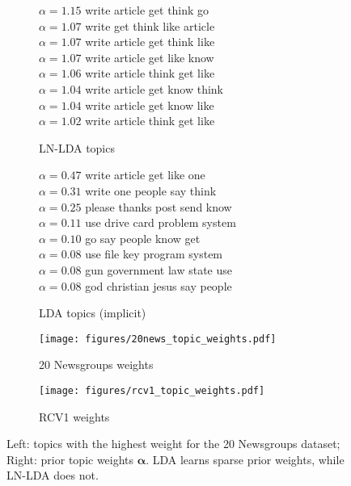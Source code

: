 \documentclass{article}
\let\vec\bm
\begin{document}
\begin{figure}
    \begin{subfigure}[b]{0.24\linewidth}
\tiny
$\alpha=1.15$ write article get think go \\
$\alpha=1.07$ write get think like article \\
$\alpha=1.07$ write article get think like \\
$\alpha=1.07$ write article get like know \\
$\alpha=1.06$ write article think get like \\
$\alpha=1.04$ write article get know think \\
$\alpha=1.04$ write article get know like \\
$\alpha=1.02$ write article think get like \\
        \caption{LN-LDA topics}
        \label{fig:lda-topics-20news-normal}
    \end{subfigure}
    \begin{subfigure}[b]{0.26\linewidth}
\tiny
$\alpha=0.47$ write article get like one \\
$\alpha=0.31$ write one people say think \\
$\alpha=0.25$ please thanks post send know \\
$\alpha=0.11$ use drive card problem system \\
$\alpha=0.10$ go say people know get \\
$\alpha=0.08$ use file key program system \\
$\alpha=0.08$ gun government law state use \\
$\alpha=0.08$ god christian jesus say people \\
        \caption{LDA topics (implicit)}
        \label{fig:lda-topics-20news-dirichlet}
    \end{subfigure}
    \begin{subfigure}[b]{0.24\linewidth}
        \texttt{[image: figures/20news\_topic\_weights.pdf]}
        \caption{20 Newsgroups weights}
        \label{fig:lda-topic-weights-20news}
    \end{subfigure}
    \begin{subfigure}[b]{0.24\linewidth}
        \texttt{[image: figures/rcv1\_topic\_weights.pdf]}
        \caption{RCV1 weights}
        \label{fig:lda-topic-weights-rcv1}
    \end{subfigure}
    \caption{Left: topics with the highest weight for the 20 Newsgroups dataset; Right: prior topic weights $\vec{\alpha}$. LDA learns sparse prior weights, while LN-LDA does not.}
    \label{fig:lda-topics}
\end{figure}
\end{document}
